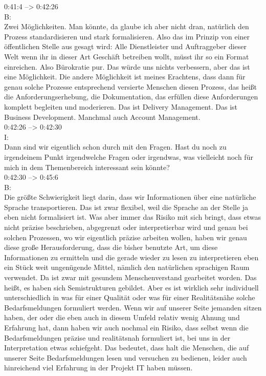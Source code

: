 0:41:4 --> 0:42:26\\
B:\\
Zwei Möglichkeiten. Man könnte, da glaube ich aber nicht dran, natürlich den Prozess standardisieren und stark formalisieren. Also das im Prinzip von einer öffentlichen Stelle aus gesagt wird: Alle Dienstleister und Auftraggeber dieser Welt wenn ihr in dieser Art Geschäft betreiben wollt, müsst ihr so ein Format einreichen. Also Bürokratie pur. Das würde uns nichts verbessern, aber das ist eine Möglichkeit. Die andere Möglichkeit ist meines Erachtens, dass dann für genau solche Prozesse entsprechend versierte Menschen diesen Prozess, das heißt die Anforderungserhebung, die Dokumentation, das erfüllen diese Anforderungen komplett begleiten und moderieren. Das ist Delivery Management. Das ist Business Development. Manchmal auch Account Management.\\

0:42:26 --> 0:42:30\\
I:\\
Dann sind wir eigentlich schon durch mit den Fragen. Hast du noch zu irgendeinem Punkt irgendwelche Fragen oder irgendwas, was vielleicht noch für mich in dem Themenbereich interessant sein könnte?\\

0:42:30 --> 0:45:6\\
B:\\
Die größte Schwierigkeit liegt darin, dass wir Informationen über eine natürliche Sprache transportieren. Das ist zwar flexibel, weil die Sprache an der Stelle ja eben nicht formalisiert ist. Was aber immer das Risiko mit sich bringt, dass etwas nicht präzise beschrieben, abgegrenzt oder interpretierbar wird und genau bei solchen Prozessen, wo wir eigentlich präzise arbeiten wollen, haben wir genau diese große Herausforderung, dass die bisher benutzte Art, um diese Informationen zu ermitteln und die gerade wieder zu lesen zu interpretieren eben ein Stück weit ungenügende Mittel, nämlich den natürlichen sprachigen Raum verwendet. Da ist zwar mit gesundem Menschenverstand gearbeitet worden. Das heißt, es haben sich Semistrukturen gebildet. Aber es ist wirklich sehr individuell unterschiedlich in was für einer Qualität oder was für einer Realitätsnähe solche Bedarfsmeldungen formuliert werden. Wenn wir auf unserer Seite jemanden sitzen haben, der oder die eben auch in diesem Umfeld relativ wenig Ahnung und Erfahrung hat, dann haben wir auch nochmal ein Risiko, dass selbst wenn die Bedarfsmeldungen präzise und realitätsnah formuliert ist, bei uns in der Interpretation etwas schiefgeht. Das bedeutet, dass halt die Menschen, die auf unserer Seite Bedarfsmeldungen lesen und versuchen zu bedienen, leider auch hinreichend viel Erfahrung in der Projekt IT haben müssen.\\
